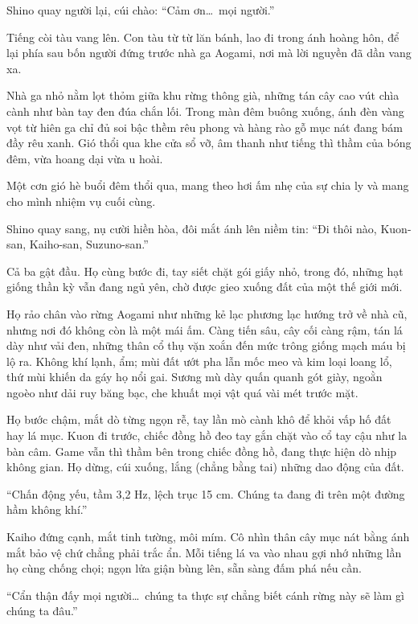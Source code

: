 \documentclass[../main.tex]{subfiles}
\begin{document}

Shino quay người lại, cúi chào: ``Cảm ơn\dots\ mọi người.''

Tiếng còi tàu vang lên. Con tàu từ từ lăn bánh, lao đi trong ánh hoàng hôn, để lại phía sau bốn người đứng trước nhà ga Aogami, nơi mà lời nguyền đã dần vang xa.

Nhà ga nhỏ nằm lọt thỏm giữa khu rừng thông già, những tán cây cao vút chìa cành như bàn tay đen đúa chắn lối. Trong màn đêm buông xuống, ánh đèn vàng vọt từ hiên ga chỉ đủ soi bậc thềm rêu phong và hàng rào gỗ mục nát đang bám đầy rêu xanh. Gió thổi qua khe cửa sổ vỡ, âm thanh như tiếng thì thầm của bóng đêm, vừa hoang dại vừa u hoài.

Một cơn gió hè buổi đêm thổi qua, mang theo hơi ấm nhẹ của sự chia ly và mang cho mình nhiệm vụ cuối cùng.

Shino quay sang, nụ cười hiền hòa, đôi mắt ánh lên niềm tin: ``Đi thôi nào, Kuon-san, Kaiho-san, Suzuno-san.''

Cả ba gật đầu. Họ cùng bước đi, tay siết chặt gói giấy nhỏ, trong đó, những hạt giống thần kỳ vẫn đang ngủ yên, chờ được gieo xuống đất của một thế giới mới.

\ct

Họ rảo chân vào rừng Aogami như những kẻ lạc phương lạc hướng trở về nhà cũ, nhưng nơi đó không còn là một mái ấm. Càng tiến sâu, cây cối càng rậm, tán lá dày như vải đen, những thân cổ thụ vặn xoắn đến mức trông giống mạch máu bị lộ ra. Không khí lạnh, ẩm; mùi đất ướt pha lẫn mốc meo và kim loại loang lổ, thứ mùi khiến da gáy họ nổi gai. Sương mù dày quấn quanh gót giày, ngoằn ngoèo như dải ruy băng bạc, che khuất mọi vật quá vài mét trước mặt.

Họ bước chậm, mắt dò từng ngọn rễ, tay lần mò cành khô để khỏi vấp hố đất hay lá mục. Kuon đi trước, chiếc đồng hồ đeo tay gắn chặt vào cổ tay cậu như la bàn câm. Game vẫn thì thầm bên trong chiếc đồng hồ, đang thực hiện dò nhịp không gian. Họ dừng, cúi xuống, lắng (chẳng bằng tai) những dao động của đất.

``Chấn động yếu, tầm 3,2 Hz, lệch trục 15 cm. Chúng ta đang đi trên một đường hầm không khí.''

Kaiho đứng cạnh, mắt tinh tường, môi mím. Cô nhìn thân cây mục nát bằng ánh mắt bảo vệ chứ chẳng phải trắc ẩn. Mỗi tiếng lá va vào nhau gợi nhớ những lần họ cùng chống chọi; ngọn lửa giận bùng lên, sẵn sàng đấm phá nếu cần.

``Cẩn thận đấy mọi người\dots\ chúng ta thực sự chẳng biết cánh rừng này sẽ làm gì chúng ta đâu.''
\end{document}
